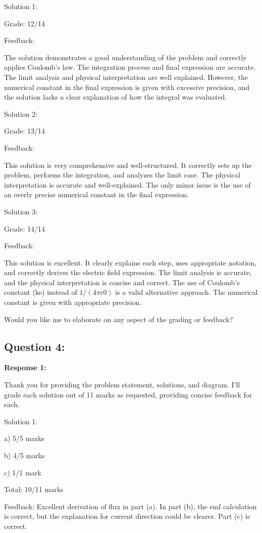 \documentclass[a4paper,11pt]{article}
\begin{document}
Solution 1:

Grade: 12/14

Feedback:

The solution demonstrates a good understanding of the problem and correctly applies Coulomb's law. The integration process and final expression are accurate. The limit analysis and physical interpretation are well explained. However, the numerical constant in the final expression is given with excessive precision, and the solution lacks a clear explanation of how the integral was evaluated.

Solution 2:

Grade: 13/14

Feedback:

This solution is very comprehensive and well-structured. It correctly sets up the problem, performs the integration, and analyzes the limit case. The physical interpretation is accurate and well-explained. The only minor issue is the use of an overly precise numerical constant in the final expression.

Solution 3:

Grade: 14/14

Feedback:

This solution is excellent. It clearly explains each step, uses appropriate notation, and correctly derives the electric field expression. The limit analysis is accurate, and the physical interpretation is concise and correct. The use of Coulomb's constant (ke) instead of \(1/(4\pi\epsilon0)\) is a valid alternative approach. The numerical constant is given with appropriate precision.

Would you like me to elaborate on any aspect of the grading or feedback?

\subsection*{Question 4:}

\textbf{Response 1:}

Thank you for providing the problem statement, solutions, and diagram. I'll grade each solution out of 11 marks as requested, providing concise feedback for each.

Solution 1:

a) 5/5 marks

b) 4/5 marks

c) 1/1 mark

Total: 10/11 marks

Feedback: Excellent derivation of flux in part (a). In part (b), the emf calculation is correct, but the explanation for current direction could be clearer. Part (c) is correct.
\end{document}
